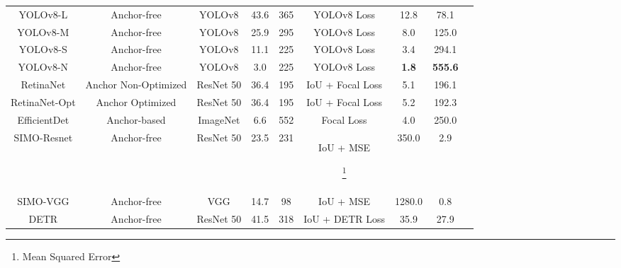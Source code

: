\begin{longtable}{|c|c|c|c|c|c|c|c|c|}
YOLOv8-L & Anchor-free & YOLOv8 & 43.6 & 365 & YOLOv8 Loss & 12.8 & 78.1  \\ 
YOLOv8-M & Anchor-free & YOLOv8 & 25.9 & 295 & YOLOv8 Loss & 8.0 & 125.0  \\ 
YOLOv8-S & Anchor-free & YOLOv8 & 11.1 & 225 & YOLOv8 Loss & 3.4 & 294.1  \\ 
YOLOv8-N & Anchor-free & YOLOv8 & 3.0 & 225 & YOLOv8 Loss & \textbf{1.8} & \textbf{555.6}  \\ 
RetinaNet & Anchor Non-Optimized & ResNet 50 & 36.4 & 195 & IoU + Focal Loss & 5.1 & 196.1  \\ 
RetinaNet-Opt & Anchor Optimized & ResNet 50 & 36.4 & 195 & IoU + Focal Loss & 5.2 & 192.3  \\ 
EfficientDet & Anchor-based & ImageNet & 6.6 & 552 & Focal Loss & 4.0 & 250.0  \\ 
SIMO-Resnet & Anchor-free & ResNet 50 & 23.5 & 231 & IoU + MSE\begin{scriptsize}\footnote{Mean Squared Error}\end{scriptsize} & 350.0 & 2.9  \\ 
SIMO-VGG & Anchor-free & VGG & 14.7 & 98 & IoU + MSE & 1280.0 & 0.8  \\ 
DETR & Anchor-free & ResNet 50 & 41.5 & 318 & IoU + DETR Loss & 35.9 & 27.9  \\ 
\hline
\end{longtable}

